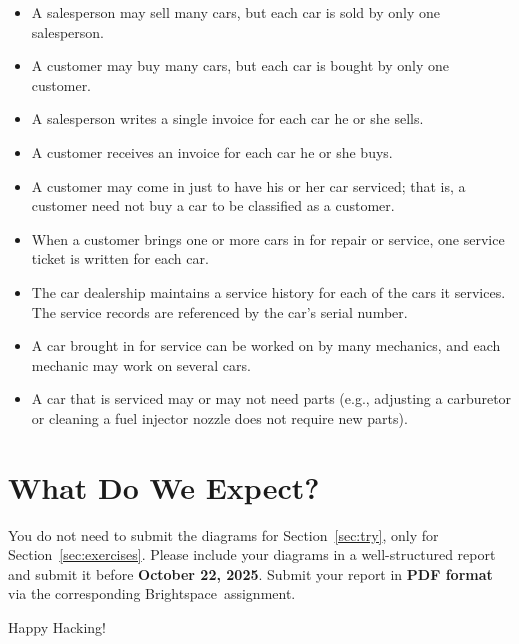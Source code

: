 \documentclass{article}
\begin{document}
\begin{enumerate}
        \begin{itemize}
            \item A salesperson may sell many cars, but each car is sold by only one salesperson.
            \item A customer may buy many cars, but each car is bought by only one customer.
            \item A salesperson writes a single invoice for each car he or she sells.
            \item A customer receives an invoice for each car he or she buys.
            \item A customer may come in just to have his or her car serviced; that is, a customer need not buy a car to be classified as a customer.
            \item When a customer brings one or more cars in for repair or service, one service ticket is written for each car.
            \item The car dealership maintains a service history for each of the cars it services. The service records are referenced by the car’s serial number.
            \item A car brought in for service can be worked on by many mechanics, and each mechanic may work on several cars.
            \item A car that is serviced may or may not need parts (e.g., adjusting a carburetor or cleaning a fuel injector nozzle does not require new parts).
        \end{itemize}
\end{enumerate}

\section{What Do We Expect?}
You do not need to submit the diagrams for Section~\ref{sec:try}, only for Section~\ref{sec:exercises}. Please include your diagrams in a well-structured report and submit it before \textbf{October 22, 2025}. Submit your report in \textbf{PDF format} via the corresponding Brightspace\texttrademark ~assignment.

\vspace{5mm}
Happy Hacking! 
\end{document}

